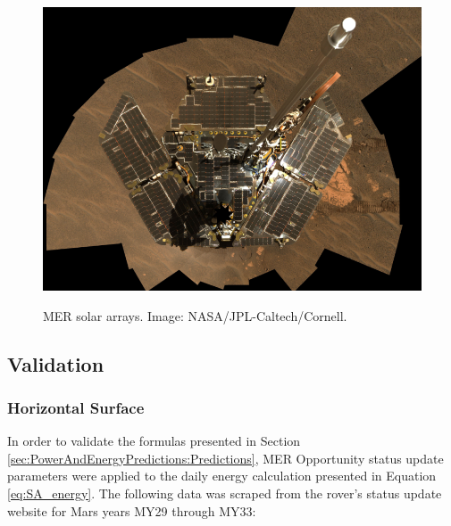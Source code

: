 \begin{figure}[h]
  \centering
  \hypersetup{linkcolor=captionTextColor}
  \includegraphics[width=0.8\linewidth]{sections/mars-solar-energy/photovoltaic-energy/images/mer-solar-arrays.png}\\
  \caption[\ac{MER} solar arrays]
          {\ac{MER} solar arrays. Image: \ac{NASA}/\ac{JPL}-Caltech/Cornell.}
  \label{fig:image:mer-solar-arrays}
\end{figure}

\subsection{Validation}
\label{sec:PowerAndEnergyPredictions:Validation}


\subsubsection{Horizontal Surface}
\label{sec:PowerAndEnergyPredictions:Validation:HorizontalSurface}

In order to validate the formulas presented in Section \ref{sec:PowerAndEnergyPredictions:Predictions}, \ac{MER} Opportunity status update parameters were applied to the daily energy calculation presented in Equation \ref{eq:SA_energy}. The following data was scraped from the rover's status update website for Mars years MY29 through MY33:


